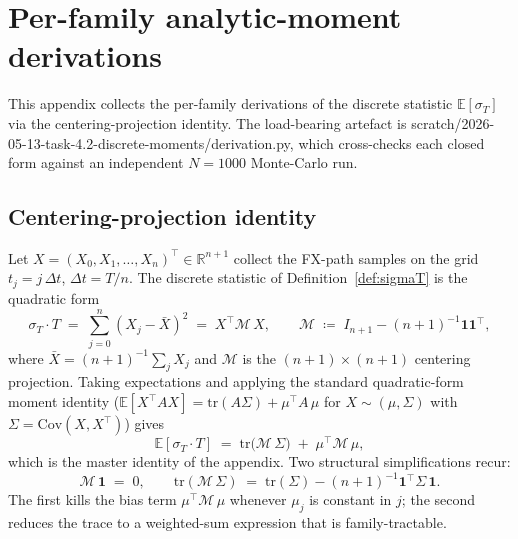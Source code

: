 \documentclass[11pt,letterpaper]{article}
\newcommand{\E}{\mathbb{E}}
\newcommand{\Cov}{\text{Cov}}
\newcommand{\R}{\mathbb{R}}
\newcommand{\sigmaT}{\sigma_{T}}
\newcommand{\centerProj}{\mathcal{M}}
\begin{document}
\appendix

\section{Per-family analytic-moment derivations}
\label{app:moments}

This appendix collects the per-family derivations of the discrete
statistic $\E[\sigmaT]$ via the centering-projection identity. The
load-bearing artefact is
\textsf{scratch/2026-05-13-task-4.2-discrete-moments/derivation.py},
which cross-checks each closed form against an independent
$N = 1000$ Monte-Carlo run.

\subsection{Centering-projection identity}
\label{app:moments:proj}

Let $X = (X_{0}, X_{1}, \dots, X_{n})^{\top} \in \R^{n+1}$ collect the
FX-path samples on the grid $t_{j} = j\,\Delta t$, $\Delta t = T/n$.
The discrete statistic of Definition~\ref{def:sigmaT} is the quadratic
form
\begin{equation}
    \sigmaT \cdot T
    \;=\;
    \sum_{j = 0}^{n} (X_{j} - \bar X)^{2}
    \;=\;
    X^{\top}\centerProj\,X,
    \qquad
    \centerProj \;\coloneqq\; I_{n+1} - (n+1)^{-1}\mathbf{1}\mathbf{1}^{\top},
    \label{eq:app:quad-form}
\end{equation}
where $\bar X = (n+1)^{-1}\sum_{j} X_{j}$ and $\centerProj$ is the
$(n+1) \times (n+1)$ centering projection. Taking expectations and
applying the standard quadratic-form moment identity
($\E[X^{\top}AX] = \mathrm{tr}(A\Sigma) + \mu^{\top}A\,\mu$ for
$X \sim (\mu, \Sigma)$ with $\Sigma = \Cov(X, X^{\top})$) gives
\begin{equation}
    \E[\sigmaT \cdot T]
    \;=\;
    \mathrm{tr}\bigl(\centerProj\,\Sigma\bigr)
    \;+\; \mu^{\top}\centerProj\,\mu,
    \label{eq:app:trace-id}
\end{equation}
which is the master identity of the appendix. Two structural simplifications
recur:
\begin{equation}
    \centerProj\,\mathbf{1} \;=\; 0,
    \qquad
    \mathrm{tr}(\centerProj\,\Sigma) \;=\; \mathrm{tr}(\Sigma) - (n+1)^{-1}\mathbf{1}^{\top}\Sigma\,\mathbf{1}.
    \label{eq:app:proj-props}
\end{equation}
The first kills the bias term $\mu^{\top}\centerProj\,\mu$ whenever
$\mu_{j}$ is constant in $j$; the second reduces the trace to a
weighted-sum expression that is family-tractable.
\end{document}
